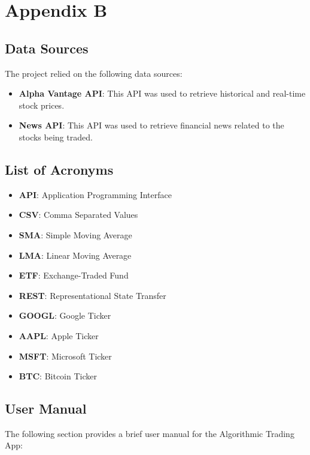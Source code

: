 
\chapter*{Appendix B} 

\label{AppendixB} 

\section*{Data Sources}

The project relied on the following data sources:

\begin{itemize}
\item \textbf{Alpha Vantage API}: This API was used to retrieve historical and real-time stock prices.
\item \textbf{News API}: This API was used to retrieve financial news related to the stocks being traded.
\end{itemize}

\section*{List of Acronyms}

\begin{itemize}
\item \textbf{API}: Application Programming Interface
\item \textbf{CSV}: Comma Separated Values
\item \textbf{SMA}: Simple Moving Average
\item \textbf{LMA}: Linear Moving Average
\item \textbf{ETF}: Exchange-Traded Fund
\item \textbf{REST}: Representational State Transfer
\item \textbf{GOOGL}: Google Ticker
\item \textbf{AAPL}: Apple Ticker
\item \textbf{MSFT}: Microsoft Ticker
\item \textbf{BTC}: Bitcoin Ticker
\end{itemize}

\section*{User Manual}

The following section provides a brief user manual for the Algorithmic Trading App:

